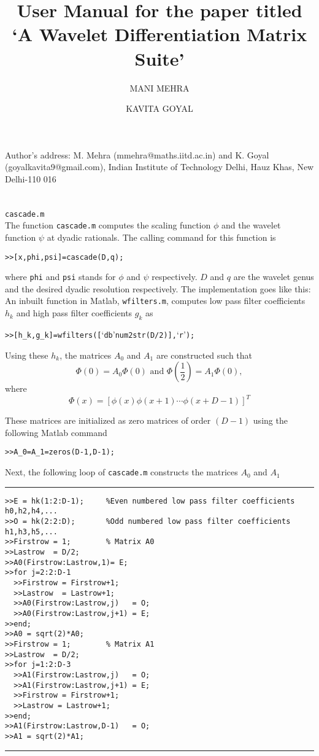 \documentclass[acmtoms]{acmtrans2m}
\title{ User Manual for the paper titled `A Wavelet Differentiation Matrix Suite'}
\author{MANI MEHRA \and KAVITA GOYAL}
\begin{document}
\setcounter{page}{111}

\begin{bottomstuff}
Author's address: M. Mehra (mmehra@maths.iitd.ac.in) and K. Goyal
(goyalkavita9@gmail.com), Indian Institute of Technology Delhi, Hauz
Khas, New Delhi-110 016
\end{bottomstuff}
\maketitle
\section{} \verb#cascade.m#\\
 The function {\tt cascade.m} computes the scaling function $\phi$ and the wavelet function $\psi$ at dyadic
rationals. The calling command for this function is
\begin{alltt}
>>[x, phi, psi]=cascade(D,q);
\end{alltt}
where \verb#phi# and \verb#psi# stands for $\phi$ and $\psi$ respectively. $D$ and $q$ are the wavelet genus and the desired dyadic resolution respectively. The implementation goes like this:\\
An inbuilt function in Matlab, {\tt wfilters.m}, computes low pass
filter coefficients $h_k$ and high pass filter coefficients $g_k$
as
\begin{alltt}
>>[h_k, g_k] = wfilters([`db' num2str(D/2)],`r');
\end{alltt}

Using these $h_k$, the matrices $A_0$ and $A_1$ are constructed such that 
\[\Phi(0)=A_0\Phi(0) \mbox{ and } \Phi(\frac{1}{2})=A_1 \Phi(0),\]
where
\[\Phi(x)=[\phi(x) \phi(x+1) \cdots \phi(x+D-1)]^T\]

 These matrices are initialized as zero matrices of order $(D-1)$ using
the following Matlab command
\begin{alltt}
>>A_0= A_1= zeros(D-1,D-1);
\end{alltt}
Next, the following loop of {\tt cascade.m} constructs the matrices $A_0$ and $A_1$
\\\hrule
\begin{verbatim}
>>E = hk(1:2:D-1);     %Even numbered low pass filter coefficients h0,h2,h4,...
>>O = hk(2:2:D);       %Odd numbered low pass filter coefficients h1,h3,h5,...
>>Firstrow = 1;        % Matrix A0
>>Lastrow  = D/2;
>>A0(Firstrow:Lastrow,1)= E;
>>for j=2:2:D-1
  >>Firstrow = Firstrow+1;
  >>Lastrow  = Lastrow+1;
  >>A0(Firstrow:Lastrow,j)   = O;
  >>A0(Firstrow:Lastrow,j+1) = E;
>>end;
>>A0 = sqrt(2)*A0;
>>Firstrow = 1;        % Matrix A1
>>Lastrow  = D/2;
>>for j=1:2:D-3
  >>A1(Firstrow:Lastrow,j)   = O;
  >>A1(Firstrow:Lastrow,j+1) = E;
  >>Firstrow = Firstrow+1;
  >>Lastrow = Lastrow+1;
>>end;
>>A1(Firstrow:Lastrow,D-1)   = O;
>>A1 = sqrt(2)*A1;
\end{verbatim}
\hrule\vspace{.5cm}
\end{document}
